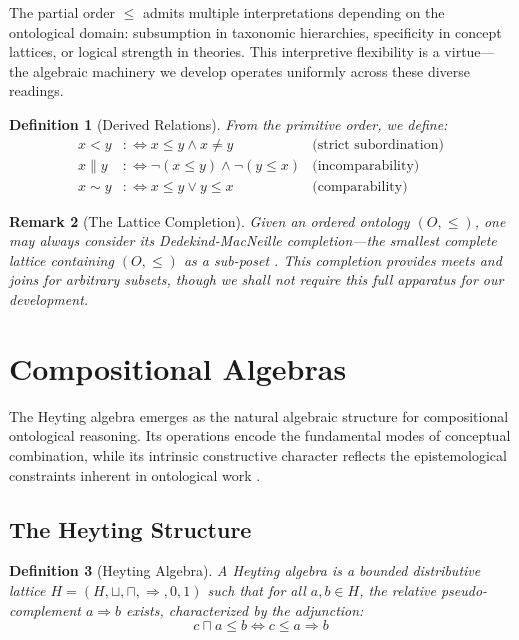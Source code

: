 \documentclass[12pt,a4paper]{article}
\newtheorem{definition}{Definition}[section]
\newtheorem{remark}[definition]{Remark}
\begin{document}
The partial order $\leq$ admits multiple interpretations depending on the ontological domain: subsumption in taxonomic hierarchies, specificity in concept lattices, or logical strength in theories. This interpretive flexibility is a virtue---the algebraic machinery we develop operates uniformly across these diverse readings.

\begin{definition}[Derived Relations]
From the primitive order, we define:
\begin{align*}
    x < y &:\iff x \leq y \land x \neq y & \text{(strict subordination)}\\
    x \parallel y &:\iff \neg(x \leq y) \land \neg(y \leq x) & \text{(incomparability)}\\
    x \sim y &:\iff x \leq y \lor y \leq x & \text{(comparability)}
\end{align*}
\end{definition}

\begin{remark}[The Lattice Completion]
Given an ordered ontology $(O, \leq)$, one may always consider its Dedekind-MacNeille completion---the smallest complete lattice containing $(O, \leq)$ as a sub-poset \citep{davey2002}. This completion provides meets and joins for arbitrary subsets, though we shall not require this full apparatus for our development.
\end{remark}

\section{Compositional Algebras}

The Heyting algebra emerges as the natural algebraic structure for compositional ontological reasoning. Its operations encode the fundamental modes of conceptual combination, while its intrinsic constructive character reflects the epistemological constraints inherent in ontological work \citep{heyting1956}.

\subsection{The Heyting Structure}

\begin{definition}[Heyting Algebra]
A \emph{Heyting algebra} \citep{heyting1956, johnstone1982} is a bounded distributive lattice $H = (H, \sqcup, \sqcap, \Rightarrow, 0, 1)$ such that for all $a, b \in H$, the \emph{relative pseudo-complement} $a \Rightarrow b$ exists, characterized by the adjunction:
$$
c \sqcap a \leq b \iff c \leq a \Rightarrow b
$$
\end{definition}
\end{document}
